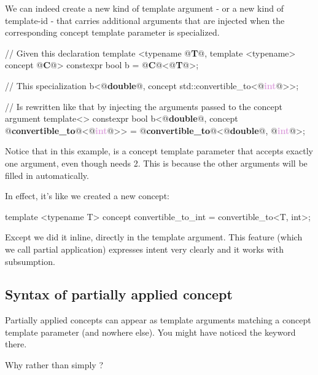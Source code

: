 \documentclass{wg21}
\begin{document}
We can indeed create a new kind of template argument - or a new kind of template-id - that carries additional arguments that are injected
when the corresponding concept template parameter is specialized.
\begin{colorblock}
// Given this declaration
template <typename @\textbf{\textcolor{OliveGreen}{T}}@, template <typename> concept @\textbf{\textcolor{WildStrawberry}{C}}@>
constexpr bool b = @\textbf{\textcolor{WildStrawberry}{C}}@<@\textbf{\textcolor{OliveGreen}{T}}@>;

// This specialization
b<@\textbf{\textcolor{OliveGreen}{double}}@, concept std::convertible_to<@\textbf{\textcolor{Plum}{int}}@>>;

// Is rewritten like that by injecting the arguments passed to the concept argument
template<>
constexpr bool b<@\textbf{\textcolor{OliveGreen}{double}}@, concept @\textbf{\textcolor{WildStrawberry}{convertible_to}}@<@\textbf{\textcolor{Plum}{int}}@>> = @\textbf{\textcolor{WildStrawberry}{convertible_to}}@<@\textbf{\textcolor{OliveGreen}{double}}@, @\textbf{\textcolor{Plum}{int}}@>;
\end{colorblock}

Notice that in this example,  is a concept template parameter that accepts exactly one argument,
even though  needs 2.
This is because the other arguments will be filled in automatically.

In effect, it's like we created a new concept:

\begin{colorblock}
template <typename T>
concept convertible_to_int = convertible_to<T, int>;
\end{colorblock}

Except we did it inline, directly in the template argument.
This feature (which we call partial application) expresses intent very clearly and it works with subsumption.

\subsection{Syntax of partially applied concept}

Partially applied concepts can appear as template arguments matching a concept template parameter (and nowhere else).
You might have noticed the  keyword there.

Why  rather than simply ?
\end{document}
